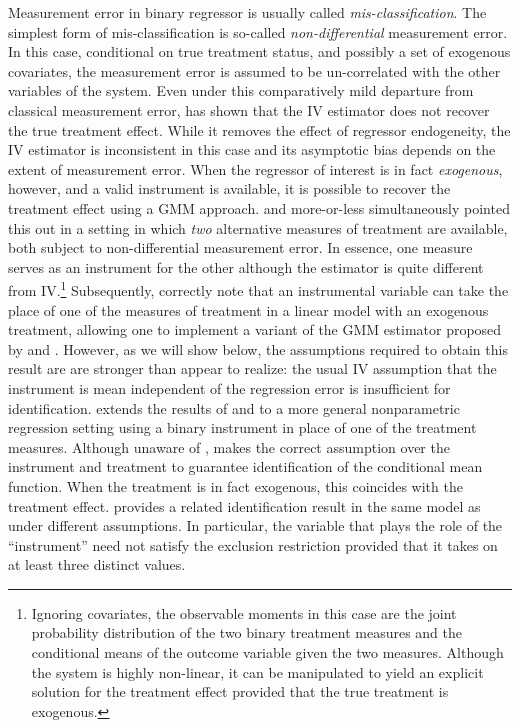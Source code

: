 Measurement error in binary regressor is usually called \emph{mis-classification}.
The simplest form of mis-classification is so-called \emph{non-differential} measurement error.
In this case, conditional on true treatment status, and possibly a set of exogenous covariates, the measurement error is assumed to be un-correlated with the other variables of the system.
Even under this comparatively mild departure from classical measurement error, \cite{Bollinger} has shown that the IV estimator does not recover the true treatment effect.
While it removes the effect of regressor endogeneity, the IV estimator is inconsistent in this case and its asymptotic bias depends on the extent of measurement error.
When the regressor of interest is in fact \emph{exogenous}, however, and a valid instrument is available, it is possible to recover the treatment effect using a GMM approach.
\cite{BBS} and \cite{KRS} more-or-less simultaneously pointed this out in a setting in which \emph{two} alternative measures of treatment are available, both subject to non-differential measurement error.
In essence, one measure serves as an instrument for the other although the estimator is quite different from IV.\footnote{Ignoring covariates, the observable moments in this case are the joint probability distribution of the two binary treatment measures and the conditional means of the outcome variable given the two measures. Although the system is highly non-linear, it can be manipulated to yield an explicit solution for the treatment effect provided that the true treatment is exogenous.}
Subsequently, \cite{FL} correctly note that an instrumental variable can take the place of one of the measures of treatment in a linear model with an exogenous treatment, allowing one to implement a variant of the GMM estimator proposed by \cite{BBS} and \cite{KRS}.
However, as we will show below, the assumptions required to obtain this result are are stronger than \cite{FL} appear to realize: the usual IV assumption that the instrument is mean independent of the regression error is insufficient for identification. 
\cite{Mahajan} extends the results of \cite{BBS} and \cite{KRS} to a more general nonparametric regression setting using a binary instrument in place of one of the treatment measures. 
Although unaware of \cite{FL}, \cite{Mahajan} makes the correct assumption over the instrument and treatment to guarantee identification of the conditional mean function.
When the treatment is in fact exogenous, this coincides with the treatment effect.
\cite{Lewbel} provides a related identification result in the same model as \cite{Mahajan} under different assumptions.
In particular, the variable that plays the role of the ``instrument'' need not satisfy the exclusion restriction provided that it takes on at least three distinct values. 

